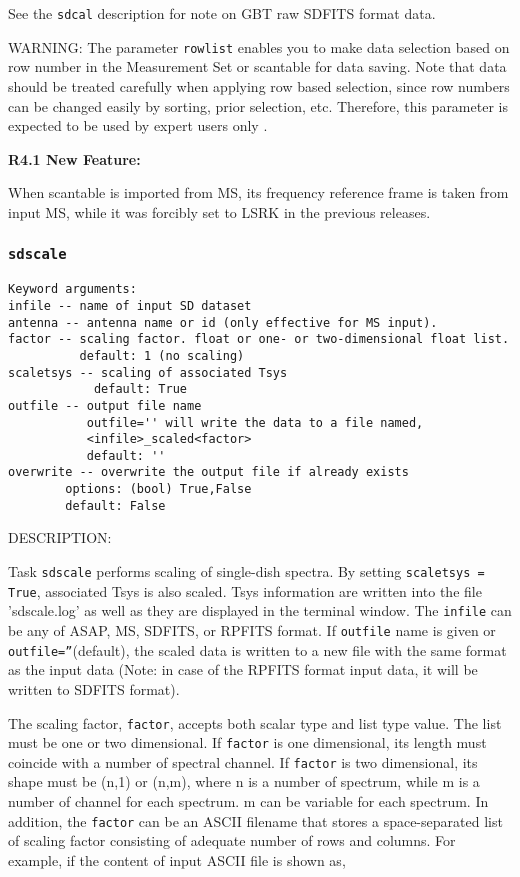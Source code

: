 See the {\tt sdcal} description for note on GBT raw SDFITS format data.

WARNING:  The parameter {\tt rowlist} enables you to make data selection based
on row number in the Measurement Set or scantable for data saving. 
Note that data should be treated carefully when applying row
based selection, since row numbers can be changed easily by
sorting, prior selection, etc. Therefore, this parameter is expected
to be used by expert users only . 

\medskip
{\bf R4.1 New Feature:}

When scantable is imported from MS, its frequency reference frame is taken 
from input MS, while it was forcibly set to LSRK in the previous releases.


\subsubsection{{\tt sdscale}}
\label{section:sd.sdtasks.tasks.sdscale}

\begin{verbatim}
Keyword arguments:
infile -- name of input SD dataset
antenna -- antenna name or id (only effective for MS input). 
factor -- scaling factor. float or one- or two-dimensional float list.
          default: 1 (no scaling)
scaletsys -- scaling of associated Tsys
            default: True
outfile -- output file name 
           outfile='' will write the data to a file named,
           <infile>_scaled<factor>
           default: ''
overwrite -- overwrite the output file if already exists
        options: (bool) True,False
        default: False
\end{verbatim}

DESCRIPTION:

Task {\tt sdscale} performs scaling of single-dish spectra.
By setting {\tt scaletsys = True}, associated Tsys is also scaled.
Tsys information are written into the file 'sdscale.log'
as well as they are displayed in the terminal window.
The {\tt infile} can be any of ASAP, MS, SDFITS, or RPFITS format.
If {\tt outfile} name is given or {\tt outfile=''}(default), the scaled data is written
to a new file with the same format as the input data (Note: in case of the
RPFITS format input data, it will be written to SDFITS format).
    
The scaling factor, {\tt factor}, accepts both scalar type and list type
value. The list must be one or two dimensional. If {\tt factor} is one
dimensional, its length must coincide with a number of spectral
channel. If {\tt factor} is two dimensional, its shape must be (n,1) or
(n,m), where n is a number of spectrum, while m is a number of channel
for each spectrum. m can be variable for each spectrum. In addition,
the {\tt factor} can be an ASCII filename that stores a space-separated list
of scaling factor consisting of adequate number of rows and columns.
For example, if the content of input ASCII file is shown as,

